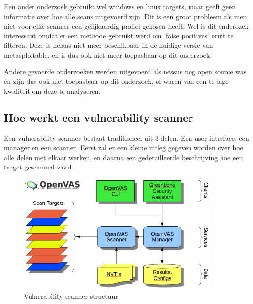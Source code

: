 Een ander onderzoek \textcite{Rageweb} gebruikt wel windows en linux targets, maar geeft geen informatie over hoe alle scans uitgevoerd zijn. Dit is een groot probleem als men niet voor elke scanner een gelijkaardig profiel gekozen heeft. Wel is dit onderozek interessant omdat er een methode gebruikt werd om 'false positives' eruit te filteren. Deze is helaas niet meer beschikbaar in de huidige versie van metasploitable, en is dus ook niet meer toepasbaar op dit onderzoek.

Andere gevoerde onderzoeken werden uitgevoerd als nessus nog open source was en zijn dus ook niet toepasbaar op dit onderzoek, of waren van een te lage kwaliteit om deze te analyseren. 

\subsection{Hoe werkt een vulnerability scanner}


Een vulnerability scanner bestaat traditioneel uit 3 delen. Een user interface, een manager en een scanner. Eerst zal er een kleine uitleg gegeven worden over hoe alle delen met elkaar werken, en daarna een gedetailleerde beschrijving hoe een target gescanned word.

\begin{figure}[h]
\includegraphics[width=10.0cm]{img/Openvas-structuur.png}
\caption{Vulnerability scanner structuur \autocite{Openvas-about}}
\label{img:openvas-structuur}
\end{figure}


